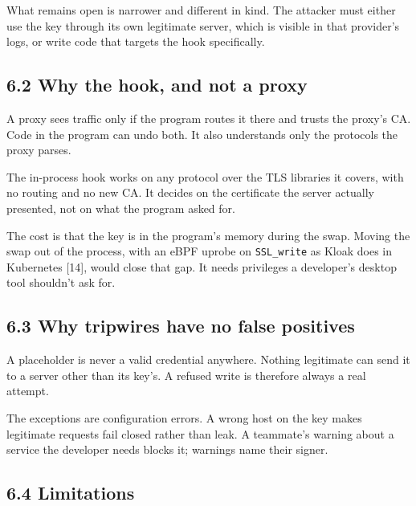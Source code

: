 \documentclass[
  11pt]{article}
\begin{document}
What remains open is narrower and
different in kind. The attacker must
either use the key through its own
legitimate server, which is visible in
that provider's logs, or write code that
targets the hook specifically.

\subsection*{6.2 Why the hook, and not a
proxy}\label{why-the-hook-and-not-a-proxy}

A proxy sees traffic only if the program
routes it there and trusts the proxy's
CA. Code in the program can undo both.
It also understands only the protocols
the proxy parses.

The in-process hook works on any
protocol over the TLS libraries it
covers, with no routing and no new CA.
It decides on the certificate the server
actually presented, not on what the
program asked for.

The cost is that the key is in the
program's memory during the swap. Moving
the swap out of the process, with an
eBPF uprobe on \texttt{SSL\_write} as
Kloak does in Kubernetes {[}14{]}, would
close that gap. It needs privileges a
developer's desktop tool shouldn't ask
for.

\subsection*{6.3 Why tripwires have no
false
positives}\label{why-tripwires-have-no-false-positives}

A placeholder is never a valid
credential anywhere. Nothing legitimate
can send it to a server other than its
key's. A refused write is therefore
always a real attempt.

The exceptions are configuration errors.
A wrong host on the key makes legitimate
requests fail closed rather than leak. A
teammate's warning about a service the
developer needs blocks it; warnings name
their signer.

\subsection*{6.4
Limitations}\label{limitations}
\end{document}
